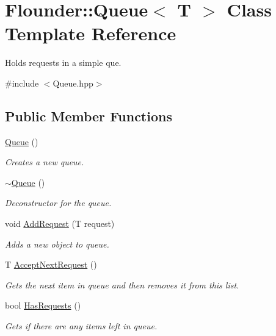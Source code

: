 \hypertarget{class_flounder_1_1_queue}{}\section{Flounder\+:\+:Queue$<$ T $>$ Class Template Reference}
\label{class_flounder_1_1_queue}


Holds requests in a simple que.  




{\ttfamily \#include $<$Queue.\+hpp$>$}

\subsection*{Public Member Functions}
\begin{DoxyCompactItemize}
\item 
\hyperlink{class_flounder_1_1_queue_a4680872cb4584545750a058db5fdba01}{Queue} ()
\begin{DoxyCompactList}\small\item\em Creates a new queue. \end{DoxyCompactList}\item 
\hyperlink{class_flounder_1_1_queue_a99c55f9408aec360fd57ce69182f4f5e}{$\sim$\+Queue} ()
\begin{DoxyCompactList}\small\item\em Deconstructor for the queue. \end{DoxyCompactList}\item 
void \hyperlink{class_flounder_1_1_queue_afbfef3392c917799a7fb36e355319e62}{Add\+Request} (T request)
\begin{DoxyCompactList}\small\item\em Adds a new object to queue. \end{DoxyCompactList}\item 
T \hyperlink{class_flounder_1_1_queue_a7bf75416f7fee75190cc05b7fa82599e}{Accept\+Next\+Request} ()
\begin{DoxyCompactList}\small\item\em Gets the next item in queue and then removes it from this list. \end{DoxyCompactList}\item 
bool \hyperlink{class_flounder_1_1_queue_a2c6e4d8630275ee76355685a5fe0d150}{Has\+Requests} ()
\begin{DoxyCompactList}\small\item\em Gets if there are any items left in queue. \end{DoxyCompactList}\item 

\end{DoxyCompactItemize}
